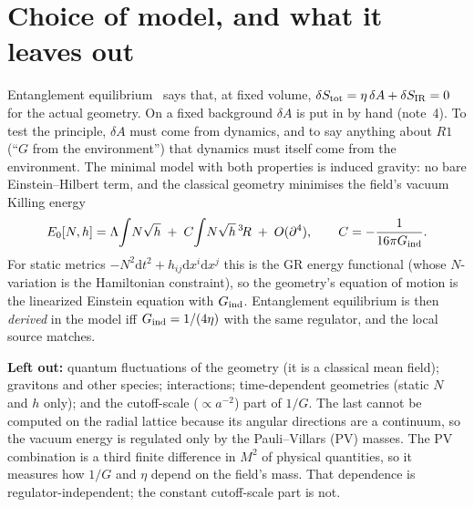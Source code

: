 \documentclass[11pt]{article}
\newcommand{\dd}{\mathrm{d}}
\begin{document}
\section{Choice of model, and what it leaves out}
Entanglement equilibrium~\cite{J2016} says that, at fixed volume, $\delta S_{\rm tot}=\eta\,\delta A+\delta S_{\rm IR}=0$ for the actual geometry. On a fixed background $\delta A$ is put in by hand (note~4). To test the principle, $\delta A$ must come from dynamics, and to say anything about $R1$ (``$G$ from the environment'') that dynamics must itself come from the environment. The minimal model with both properties is induced gravity: no bare Einstein--Hilbert term, and the classical geometry minimises the field's vacuum Killing energy
\begin{equation}
E_0[N,h]=\Lambda\!\int\! N\sqrt h\;+\;C\!\int\! N\sqrt h\,{}^{3}\!R\;+\;O(\partial^4),\qquad C=-\frac{1}{16\pi G_{\rm ind}} .
\label{eq:Eind}
\end{equation}
For static metrics $-N^2\dd t^2+h_{ij}\dd x^i\dd x^j$ this is the GR energy functional (whose $N$-variation is the Hamiltonian constraint), so the geometry's equation of motion is the linearized Einstein equation with $G_{\rm ind}$. Entanglement equilibrium is then \emph{derived} in the model iff $G_{\rm ind}=1/(4\eta)$ with the same regulator, and the local source matches.

\textbf{Left out:} quantum fluctuations of the geometry (it is a classical mean field); gravitons and other species; interactions; time-dependent geometries (static $N$ and $h$ only); and the cutoff-scale ($\propto a^{-2}$) part of $1/G$. The last cannot be computed on the radial lattice because its angular directions are a continuum, so the vacuum energy is regulated only by the Pauli--Villars (PV) masses. The PV combination is a third finite difference in $M^2$ of physical quantities, so it measures how $1/G$ and $\eta$ depend on the field's mass. That dependence is regulator-independent; the constant cutoff-scale part is not.
\end{document}
